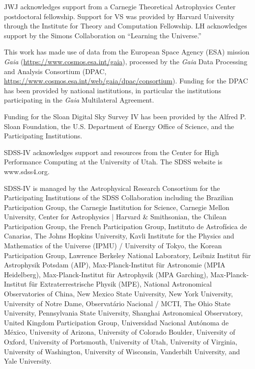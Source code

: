 \documentclass[twocolumn]{aastex631}
\begin{document}
  JWJ acknowledges support from a Carnegie Theoretical Astrophysics Center postdoctoral fellowship. Support for VS was provided by Harvard University through the Institute for Theory and Computation Fellowship. LH acknowledges support by the Simons Collaboration on ``Learning the Universe.''

  This work has made use of data from the European Space Agency (ESA) mission {\it Gaia} (\url{https://www.cosmos.esa.int/gaia}), processed by the {\it Gaia} Data Processing and Analysis Consortium (DPAC, \url{https://www.cosmos.esa.int/web/gaia/dpac/consortium}). Funding for the DPAC has been provided by national institutions, in particular the institutions participating in the {\it Gaia} Multilateral Agreement.
  
  Funding for the Sloan Digital Sky 
  Survey IV has been provided by the 
  Alfred P. Sloan Foundation, the U.S. 
  Department of Energy Office of 
  Science, and the Participating 
  Institutions. 
  
  SDSS-IV acknowledges support and 
  resources from the Center for High 
  Performance Computing  at the 
  University of Utah. The SDSS 
  website is www.sdss4.org.
  
  SDSS-IV is managed by the 
  Astrophysical Research Consortium 
  for the Participating Institutions 
  of the SDSS Collaboration including 
  the Brazilian Participation Group, 
  the Carnegie Institution for Science, 
  Carnegie Mellon University, Center for 
  Astrophysics | Harvard \& 
  Smithsonian, the Chilean Participation 
  Group, the French Participation Group, 
  Instituto de Astrof\'isica de 
  Canarias, The Johns Hopkins 
  University, Kavli Institute for the 
  Physics and Mathematics of the 
  Universe (IPMU) / University of 
  Tokyo, the Korean Participation Group, 
  Lawrence Berkeley National Laboratory, 
  Leibniz Institut f\"ur Astrophysik 
  Potsdam (AIP),  Max-Planck-Institut 
  f\"ur Astronomie (MPIA Heidelberg), 
  Max-Planck-Institut f\"ur 
  Astrophysik (MPA Garching), 
  Max-Planck-Institut f\"ur 
  Extraterrestrische Physik (MPE), 
  National Astronomical Observatories of 
  China, New Mexico State University, 
  New York University, University of 
  Notre Dame, Observat\'ario 
  Nacional / MCTI, The Ohio State 
  University, Pennsylvania State 
  University, Shanghai 
  Astronomical Observatory, United 
  Kingdom Participation Group, 
  Universidad Nacional Aut\'onoma 
  de M\'exico, University of Arizona, 
  University of Colorado Boulder, 
  University of Oxford, University of 
  Portsmouth, University of Utah, 
  University of Virginia, University 
  of Washington, University of 
  Wisconsin, Vanderbilt University, 
  and Yale University.
\end{document}
